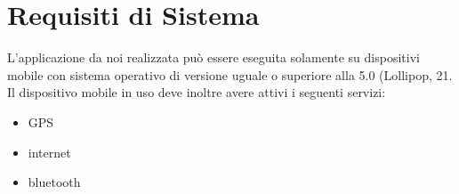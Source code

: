 \section{Requisiti di Sistema} 
L'applicazione da noi realizzata può essere eseguita solamente su dispositivi mobile con sistema operativo  di versione uguale o superiore alla 5.0 (Lollipop,  21. \\
Il dispositivo mobile in uso deve inoltre avere attivi i seguenti servizi:
\begin{itemize}
	\item GPS
	\item internet
	\item bluetooth
\end{itemize} 